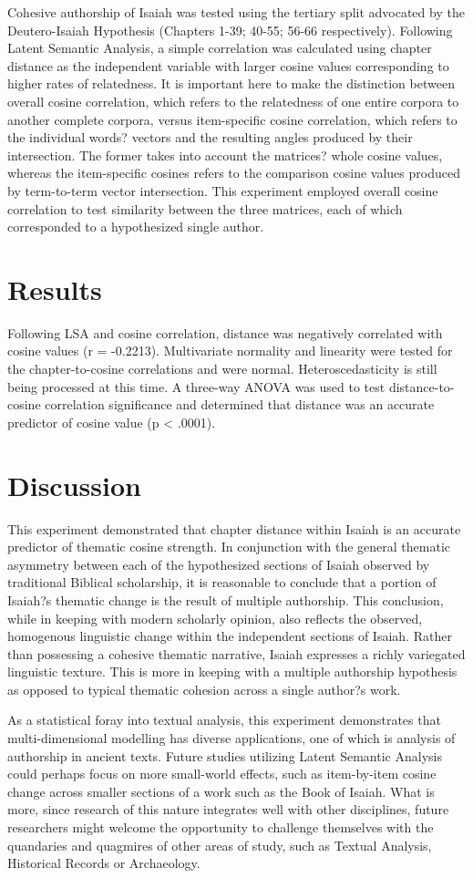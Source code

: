 \documentclass{statsoc}
\begin{document}
Cohesive authorship of Isaiah was tested using the tertiary split advocated by the Deutero-Isaiah Hypothesis (Chapters 1-39; 40-55; 56-66 respectively). Following Latent Semantic Analysis, a simple correlation was calculated using chapter distance as the independent variable with larger cosine values corresponding to higher rates of relatedness. It is important here to make the distinction between overall cosine correlation, which refers to the relatedness of one entire corpora to another complete corpora, versus item-specific cosine correlation, which refers to the individual words? vectors and the resulting angles produced by their intersection. The former takes into account the matrices? whole cosine values, whereas the item-specific cosines refers to the comparison cosine values produced by term-to-term vector intersection. This experiment employed overall cosine correlation to test similarity between the three matrices, each of which corresponded to a hypothesized single author.

\section{Results}
Following LSA and cosine correlation, distance was negatively correlated with cosine values (r = -0.2213). Multivariate normality and linearity were tested for the chapter-to-cosine correlations and were normal. Heteroscedasticity is still being processed at this time. A three-way ANOVA was used to test distance-to-cosine correlation significance and determined that distance was an accurate predictor of cosine value (p < .0001). 

\section{Discussion}
This experiment demonstrated that chapter distance within Isaiah is an accurate predictor of thematic cosine strength. In conjunction with the general thematic asymmetry between each of the hypothesized sections of Isaiah observed by traditional Biblical scholarship, it is reasonable to conclude that a portion of Isaiah?s thematic change is the result of multiple authorship. This conclusion, while in keeping with modern scholarly opinion, also reflects the observed, homogenous linguistic change within the independent sections of Isaiah. Rather than possessing a cohesive thematic narrative, Isaiah expresses a richly variegated linguistic texture. This is more in keeping with a multiple authorship hypothesis as opposed to typical thematic cohesion across a single author?s work. 

As a statistical foray into textual analysis, this experiment demonstrates that multi-dimensional modelling has diverse applications, one of which is analysis of authorship in ancient texts. Future studies utilizing Latent Semantic Analysis could perhaps focus on more small-world effects, such as item-by-item cosine change across smaller sections of a work such as the Book of Isaiah. What is more, since research of this nature integrates well with other disciplines, future researchers might welcome the opportunity to challenge themselves with the quandaries and quagmires of other areas of study, such as Textual Analysis, Historical Records or Archaeology.
\end{document}
